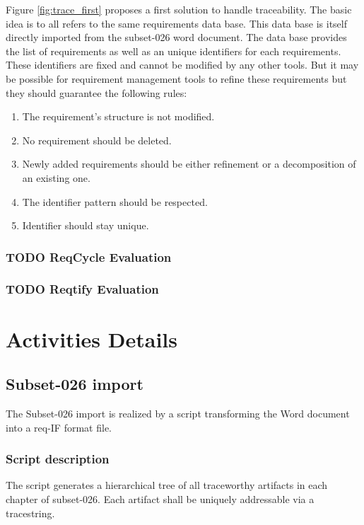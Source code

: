 \documentclass[11pt]{template/openetcs_report}
\begin{document}
Figure \ref{fig:trace_first} proposes a first solution to handle traceability.
The basic idea is to all refers to the same requirements data base. This data
base is itself directly imported from the subset-026 word document. The data
base provides the list of requirements as well as an unique identifiers for each
requirements. These identifiers are fixed and cannot be modified by any other
tools. But it may be possible for requirement management tools to refine these
requirements but they should guarantee the following rules:
\begin{enumerate}
\item The requirement's structure is not modified.
\item No requirement should be deleted.
\item Newly added requirements should be either refinement or a decomposition of an
existing one.
\item The identifier pattern should be respected.
\item Identifier should stay unique.
\end{enumerate}


\subsection{{\bfseries\sffamily TODO} ReqCycle  Evaluation}
\label{sec-1-2}
\subsection{{\bfseries\sffamily TODO} Reqtify Evaluation}
\label{sec-1-3}


\chapter{Activities Details}

\section{Subset-026 import}
\label{sec-2}
The Subset-026 import is realized by a script transforming the Word document
into a req-IF format file.
\subsection{Script description}
\label{sec-2-1}
The script  generates a hierarchical tree of all traceworthy
artifacts in each chapter of subset-026. Each artifact shall be uniquely
addressable via a tracestring.
\end{document}
